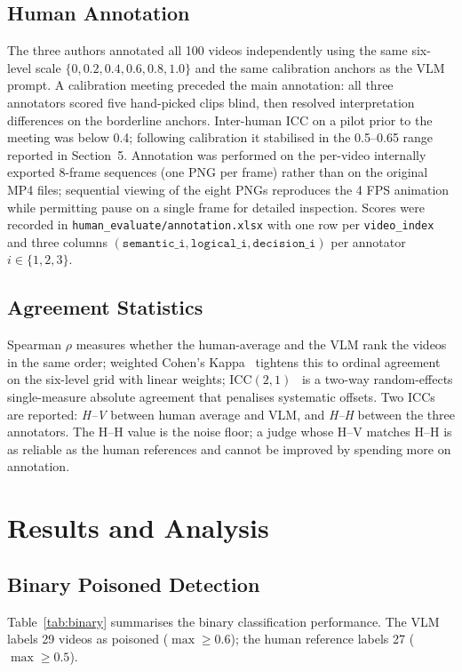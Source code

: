\documentclass[letterpaper]{article}
\begin{document}
\subsection{Human Annotation}
The three authors annotated all 100 videos independently using the
same six-level scale $\{0,0.2,0.4,0.6,0.8,1.0\}$ and the same
calibration anchors as the VLM prompt. A calibration meeting
preceded the main annotation: all three annotators scored five
hand-picked clips blind, then resolved interpretation differences on
the borderline anchors. Inter-human ICC on a pilot prior to the
meeting was below 0.4; following calibration it stabilised in the
0.5--0.65 range reported in Section~5. Annotation was performed on
the per-video internally exported 8-frame sequences (one PNG per
frame) rather than on the original MP4 files; sequential viewing of
the eight PNGs reproduces
the 4 FPS animation while permitting pause on a single frame for
detailed inspection. Scores were recorded in
\texttt{human\_evaluate/annotation.xlsx}
with one row per \texttt{video\_index} and three columns
$(\texttt{semantic\_i}, \texttt{logical\_i}, \texttt{decision\_i})$
per annotator $i\!\in\!\{1,2,3\}$.

\subsection{Agreement Statistics}
Spearman $\rho$ measures whether the human-average and the VLM rank
the videos in the same order; weighted Cohen's
Kappa~\citep{cohen1968weightedkappa} tightens this to ordinal
agreement on the six-level grid with linear weights;
ICC$(2,1)$~\citep{shrout1979intraclass} is a two-way random-effects
single-measure absolute agreement that penalises systematic offsets.
Two ICCs are reported: \emph{H--V} between human average and VLM, and
\emph{H--H} between the three annotators. The H--H value is the noise
floor; a judge whose H--V matches H--H is as reliable as the human
references and cannot be improved by spending more on annotation.

\section{Results and Analysis}

\subsection{Binary Poisoned Detection}
Table~\ref{tab:binary} summarises the binary classification
performance. The VLM labels 29 videos as poisoned
($\max\!\ge\!0.6$); the human reference labels 27
($\max\!\ge\!0.5$).
\end{document}
